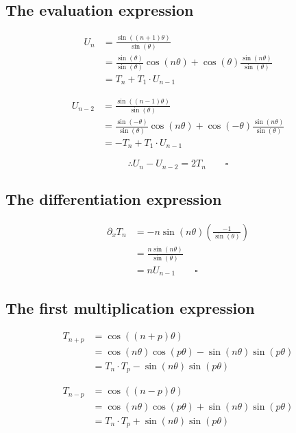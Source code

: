 \documentclass{article}
\begin{document}
\subsection{The evaluation expression}\label{deriv_eval}

\begin{align*}
U_n &= \frac{\sin((n+1) \theta)}{\sin(\theta)} \\
&= \frac{\sin(\theta)}{\sin(\theta)} \cos(n \theta) + \cos(\theta) \frac{\sin(n \theta)}{\sin(\theta)} \\
&= T_n + T_1 \cdot U_{n-1}
\end{align*}

\begin{align*}
U_{n-2} &= \frac{\sin((n-1) \theta)}{\sin(\theta)} \\
&= \frac{\sin(-\theta)}{\sin(\theta)} \cos(n \theta) + \cos(-\theta) \frac{\sin(n \theta)}{\sin(\theta)} \\
&= -T_n + T_1 \cdot U_{n-1}
\end{align*}

\begin{equation*}
\therefore U_n - U_{n-2} = 2 T_n \quad \quad \square
\end{equation*}
    
\subsection{The differentiation expression}\label{deriv_diff}

\begin{align*}
\partial_x T_n &= -n \sin(n \theta) \left(\frac{-1}{\sin(\theta)}\right) \\
&= \frac{n \sin(n \theta)}{\sin(\theta)} \\
&= n U_{n-1} \quad \quad \square
\end{align*}

\subsection{The first multiplication expression}\label{deriv_mult1}

\begin{align*}
T_{n+p} &= \cos((n+p) \theta) \\
&= \cos(n \theta) \cos(p \theta) - \sin(n \theta) \sin(p \theta) \\
&= T_n \cdot T_p - \sin(n \theta) \sin(p \theta)
\end{align*}

\begin{align*}
T_{n-p} &= \cos((n-p) \theta) \\
&= \cos(n \theta) \cos(p \theta) + \sin(n \theta) \sin(p \theta) \\
&= T_n \cdot T_p + \sin(n \theta) \sin(p \theta)
\end{align*}
\end{document}
